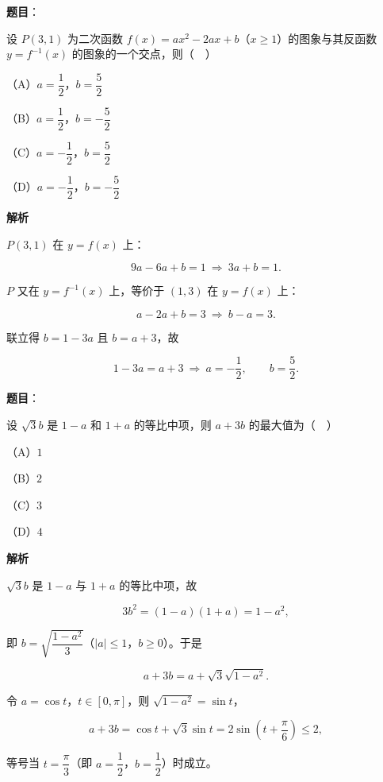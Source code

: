 \begin{answer}

\textbf{题目}：

设 $P(3,1)$ 为二次函数 $f(x)=ax^2-2ax+b$（$x\geqslant1$）的图象与其反函数 $y=f^{-1}(x)$ 的图象的一个交点，则（　）

（A）$a=\dfrac12$，$b=\dfrac52$

（B）$a=\dfrac12$，$b=-\dfrac52$

（C）$a=-\dfrac12$，$b=\dfrac52$

（D）$a=-\dfrac12$，$b=-\dfrac52$

\textbf{解析}

$P(3,1)$ 在 $y=f(x)$ 上：

\nopagebreak[4]
\[9a-6a+b=1\ \Rightarrow\ 3a+b=1.\]

$P$ 又在 $y=f^{-1}(x)$ 上，等价于 $(1,3)$ 在 $y=f(x)$ 上：

\nopagebreak[4]
\[a-2a+b=3\ \Rightarrow\ b-a=3.\]

联立得 $b=1-3a$ 且 $b=a+3$，故

\nopagebreak[4]
\[1-3a=a+3\ \Rightarrow\ a=-\frac12,\qquad b=\frac52.\]


\end{answer}
\begin{answer}

\textbf{题目}：

设 $\sqrt3b$ 是 $1-a$ 和 $1+a$ 的等比中项，则 $a+3b$ 的最大值为（　）

（A）$1$

（B）$2$

（C）$3$

（D）$4$

\textbf{解析}

$\sqrt3b$ 是 $1-a$ 与 $1+a$ 的等比中项，故

\nopagebreak[4]
\[3b^2=(1-a)(1+a)=1-a^2,\]

即 $b=\sqrt{\dfrac{1-a^2}3}$（$|a|\leqslant1$，$b\geqslant0$）。于是

\nopagebreak[4]
\[a+3b=a+\sqrt3\sqrt{1-a^2}.\]

令 $a=\cos t$，$t\in[0,\pi]$，则 $\sqrt{1-a^2}=\sin t$，

\nopagebreak[4]
\[a+3b=\cos t+\sqrt3\sin t=2\sin\left(t+\frac{\pi}6\right)\leqslant2,\]

等号当 $t=\dfrac{\pi}3$（即 $a=\dfrac12$，$b=\dfrac12$）时成立。


\end{answer}
